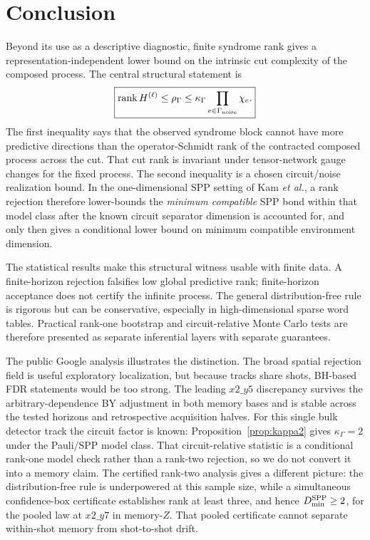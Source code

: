 \documentclass[11pt]{article}
\newcommand{\rank}{\operatorname{rank}}
\begin{document}
\section{Conclusion}

Beyond its use as a descriptive diagnostic, finite syndrome rank gives a representation-independent lower bound on the intrinsic cut complexity of the composed process. The central structural statement is
\[
    \boxed{\rank H^{(\ell)}\le\rho_\Gamma\le
    \kappa_\Gamma
    \prod_{e\in\Gamma_{\rm noise}}\chi_e.}
\]
The first inequality says that the observed syndrome block cannot have more predictive directions than the operator-Schmidt rank of the contracted composed process across the cut. That cut rank is invariant under tensor-network gauge changes for the fixed process. The second inequality is a chosen circuit/noise realization bound. In the one-dimensional SPP setting of Kam \emph{et al.}, a rank rejection therefore lower-bounds the \emph{minimum compatible} SPP bond within that model class after the known circuit separator dimension is accounted for, and only then gives a conditional lower bound on minimum compatible environment dimension.

The statistical results make this structural witness usable with finite data. A finite-horizon rejection falsifies low global predictive rank; finite-horizon acceptance does not certify the infinite process. The general distribution-free rule is rigorous but can be conservative, especially in high-dimensional sparse word tables. Practical rank-one bootstrap and circuit-relative Monte Carlo tests are therefore presented as separate inferential layers with separate guarantees.

The public Google analysis illustrates the distinction. The broad spatial rejection field is useful exploratory localization, but because tracks share shots, BH-based FDR statements would be too strong. The leading $x2\_y5$ discrepancy survives the arbitrary-dependence BY adjustment in both memory bases and is stable across the tested horizons and retrospective acquisition halves. For this single bulk detector track the circuit factor is known: Proposition~\ref{prop:kappa2} gives $\kappa_\Gamma=2$ under the Pauli/SPP model class. That circuit-relative statistic is a conditional rank-one model check rather than a rank-two rejection, so we do not convert it into a memory claim. The certified rank-two analysis gives a different picture: the distribution-free rule is underpowered at this sample size, while a simultaneous confidence-box certificate establishes rank at least three, and hence $D_{\min}^{\rm SPP}\ge2$, for the pooled law at $x2\_y7$ in memory-$Z$. That pooled certificate cannot separate within-shot memory from shot-to-shot drift.
\end{document}
